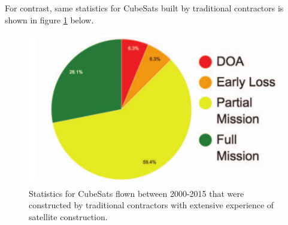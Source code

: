 \documentclass[english,12pt,a4paper,pdftex,elec,utf8]{aaltothesis}
\begin{document}
For contrast, same statistics for CubeSats built by traditional contractors is shown in figure \ref{tradiotionalflown2015pic} below. \par
\begin{figure}[h!]
\centering
\includegraphics[scale=0.5]{traditionalflown2015}
\caption{Statistics for CubeSats flown between 2000-2015 that were constructed by traditional contractors with extensive experience of satellite construction. \cite{Swart2016}}
\label{tradiotionalflown2015pic}
\end{figure} 
\end{document}
